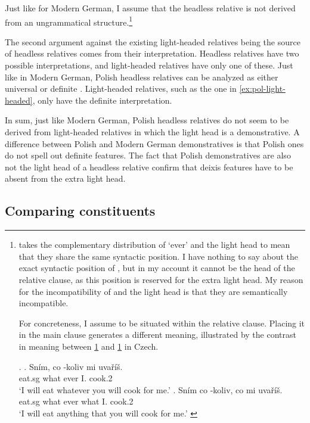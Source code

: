 Just like for Modern German, I assume that the headless relative is not derived from an ungrammatical structure.\footnote{
\citet{citko2004} takes the complementary distribution of  `ever' and the light head to mean that they share the same syntactic position. I have nothing to say about the exact syntactic position of , but in my account it cannot be the head of the relative clause, as this position is reserved for the extra light head. My reason for the incompatibility of  and the light head is that they are semantically incompatible.

For concreteness, I assume  to be situated within the relative clause. Placing it in the main clause generates a different meaning, illustrated by the contrast in meaning between \ref{ex:cz-wh-ever} and \ref{ex:cz-ever-wh} in Czech.

\ex.
\ag. Sním, co -koliv mi uvaříš.\\
 eat.sg what ever I. cook.2\\
 `I will eat whatever you will cook for me.'\label{ex:cz-wh-ever}
\bg. Sním co -koliv, co mi uvaříš.\\
 eat.sg what ever what I. cook.2\\
 `I will eat anything that you will cook for me.' \label{ex:cz-ever-wh}

\phantom{x}
}

The second argument against the existing light-headed relatives being the source of headless relatives comes from their interpretation. Headless relatives have two possible interpretations, and light-headed relatives have only one of these.
Just like in Modern German, Polish headless relatives can be analyzed as either universal or definite .
Light-headed relatives, such as the one in \ref{ex:pol-light-headed}, only have the definite interpretation.

In sum, just like Modern German, Polish headless relatives do not seem to be derived from light-headed relatives in which the light head is a demonstrative. A difference between Polish and Modern German demonstratives is that Polish ones do not spell out definite features. The fact that Polish demonstratives are also not the light head of a headless relative confirm that deixis features have to be absent from the extra light head.

\subsection{Comparing constituents}\label{sec:comparing-polish}

